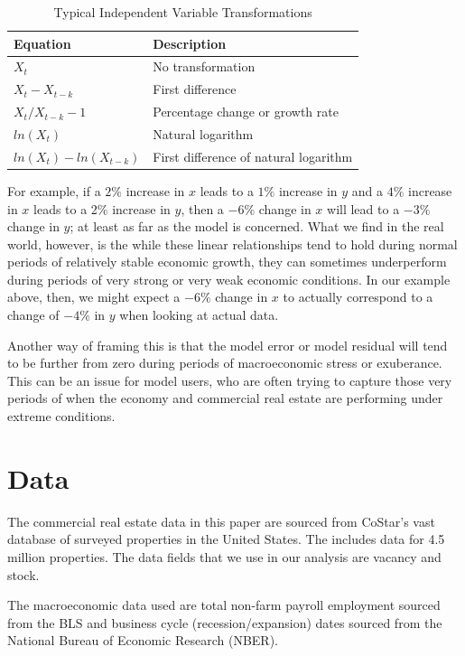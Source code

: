 \documentclass[10pt]{article}
\begin{document}
\begin{table}[h]
\caption{Typical Independent Variable Transformations} \label{trans}
\begin{center}
\begin{tabular}{l l}
Equation & Description \\ \midrule
$X_t$ & No transformation \\
$X_t-X_{t-k}$ & First difference \\
$X_t/X_{t-k}-1$ & Percentage change or growth rate \\
$ln(X_t)$ & Natural logarithm \\
$ln(X_t)-ln(X_{t-k})$ & First difference of natural logarithm \\
\midrule
\end{tabular}
\end{center}
\label{default}
\end{table}%

For example, if a $2\%$ increase in $x$ leads to a $1\%$ increase in $y$ and a $4\%$ increase in $x$ leads to a 2\% increase in $y$, then a $-6\%$ change in $x$ will lead to a $-3\%$ change in $y$; at least as far as the model is concerned.  What we find in the real world, however, is the while these linear relationships tend to hold during normal periods of relatively stable economic growth, they can sometimes underperform during periods of very strong or very weak economic conditions.  In our example above, then, we might expect a $-6\%$ change in $x$ to actually correspond to a change of $-4\%$ in $y$ when looking at actual data.

Another way of framing this is that the model error or model residual will tend to be further from zero during periods of macroeconomic stress or exuberance.  This can be an issue for model users, who are often trying to capture those very periods of when the economy and commercial real estate are performing under extreme conditions.

\section*{Data}

The commercial real estate data in this paper are sourced from CoStar's vast database of surveyed properties in the United States.  The includes data for 4.5 million properties.  The data fields that we use in our analysis are vacancy and stock.

The macroeconomic data used are total non-farm payroll employment sourced from the BLS and business cycle (recession/expansion) dates sourced from the National Bureau of Economic Research (NBER).
\end{document}
